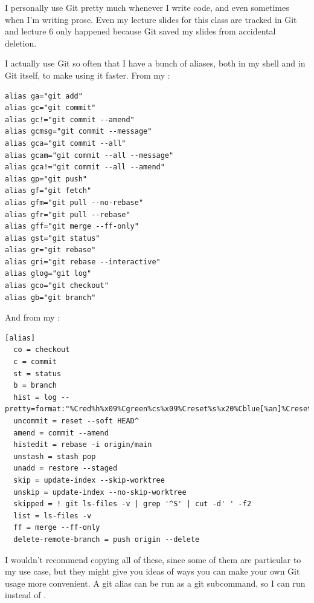 I personally use Git pretty much whenever I write code, and even sometimes when
I'm writing prose.  Even my lecture slides for this class are tracked in
Git\textellipsis{} and lecture 6 only happened because Git saved my slides from
accidental deletion.

I actually use Git so often that I have a bunch of aliases, both in my shell
and in Git itself, to make using it faster.  From my :

\begin{verbatim}
alias ga="git add"
alias gc="git commit"
alias gc!="git commit --amend"
alias gcmsg="git commit --message"
alias gca="git commit --all"
alias gcam="git commit --all --message"
alias gca!="git commit --all --amend"
alias gp="git push"
alias gf="git fetch"
alias gfm="git pull --no-rebase"
alias gfr="git pull --rebase"
alias gff="git merge --ff-only"
alias gst="git status"
alias gr="git rebase"
alias gri="git rebase --interactive"
alias glog="git log"
alias gco="git checkout"
alias gb="git branch"
\end{verbatim}

And from my :

\begin{verbatim}
[alias]
  co = checkout
  c = commit
  st = status
  b = branch
  hist = log --pretty=format:"%Cred%h%x09%Cgreen%cs%x09%Creset%s%x20%Cblue[%an]%Creset"
  uncommit = reset --soft HEAD^
  amend = commit --amend
  histedit = rebase -i origin/main
  unstash = stash pop
  unadd = restore --staged
  skip = update-index --skip-worktree
  unskip = update-index --no-skip-worktree
  skipped = ! git ls-files -v | grep '^S' | cut -d' ' -f2
  list = ls-files -v
  ff = merge --ff-only
  delete-remote-branch = push origin --delete
\end{verbatim}

I wouldn't recommend copying all of these, since some of them are particular to
my use case, but they might give you ideas of ways you can make your own Git
usage more convenient.  A git alias can be run as a git subcommand, so I can
run  instead of .


